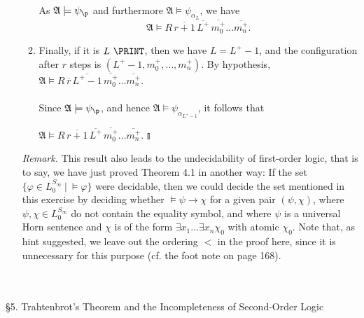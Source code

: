 \begin{enumerate}[1.]
\begin{enumerate}[1)]
\ \\
As $\mathfrak{A} \models \psi_\p$ and furthermore $\mathfrak{A} \models \psi_{\alpha_L}$, we have
\[
\mathfrak{A} \models R \, \overline{r + 1} \, \overline{L^+} \, \overline{m_0^+} \ldots \overline{m_n^+}.
\]
\item Finally, if it is $L \ \PRINT$, then we have $L = L^+ - 1$, and the configuration after $r$ steps is $(L^+ - 1, m_0^+, \ldots, m_n^+)$. By hypothesis, $\mathfrak{A} \models R \, \overline{r} \, \overline{L^+ - 1} \, \overline{m_0^+} \ldots \overline{m_n^+}$.\\
\ \\
Since $\mathfrak{A} \models \psi_\p$, and hence $\mathfrak{A} \models \psi_{\alpha_{L^+ - 1}}$, it follows that
\begin{center}
\phantom{a} \hfill $\mathfrak{A} \models R \, \overline{r + 1} \, \overline{L^+} \, \overline{m_0^+} \ldots \overline{m_n^+}.$ \hfill $\talloblong$
\end{center}
\end{enumerate}
\textit{Remark.} This result also leads to the undecidability of first-order logic, that is to say, we have just proved Theorem 4.1 in another way: If the set $\{ \varphi \in L_0^{S_\infty} \ | \ \models \varphi \}$ were decidable, then we could decide the set mentioned in this exercise by deciding whether $\models \psi \to \chi$ for a given pair $(\psi, \chi)$, where $\psi, \chi \in L_0^{S_\infty}$ do not contain the equality symbol, and where $\psi$ is a universal Horn sentence and $\chi$ is of the form $\exists x_1 \ldots \exists x_n \chi_0$ with atomic $\chi_0$. Note that, as hint suggested, we leave out the ordering $<$ in the proof here, since it is unnecessary for this purpose (cf. the foot note on page 168).
\end{enumerate}
\
\\
\\
{\large \S5. Trahtenbrot's Theorem and the Incompleteness of Second-Order Logic}
